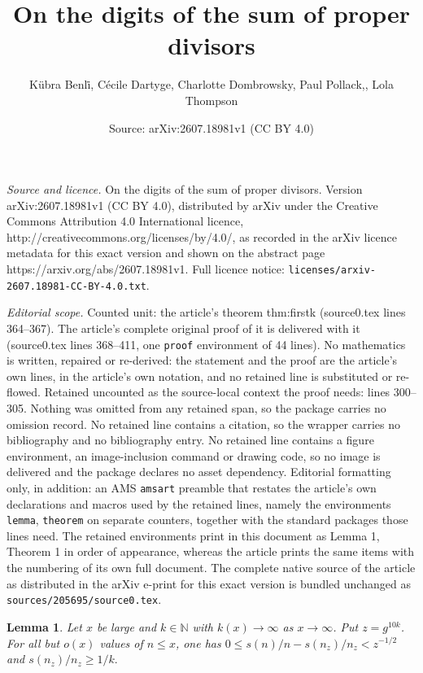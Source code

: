 \documentclass[10pt,a4paper]{amsart}
\title{On the digits of the sum of proper divisors}
\author{K\"ubra Benl\.i, C\'ecile Dartyge, Charlotte Dombrowsky, Paul Pollack,, Lola Thompson}
\date{Source: arXiv:2607.18981v1 (CC BY 4.0)}
\newtheorem{lemma}{Lemma}
\begin{document}
\maketitle

\noindent\emph{Source and licence.} On the digits of the sum of proper divisors. Version arXiv:2607.18981v1 (CC BY 4.0), distributed by arXiv under the Creative Commons Attribution 4.0 International licence, http://creativecommons.org/licenses/by/4.0/, as recorded in the arXiv licence metadata for this exact version and shown on the abstract page https://arxiv.org/abs/2607.18981v1. Full licence notice: \texttt{licenses/arxiv-2607.18981-CC-BY-4.0.txt}.\par\smallskip

\noindent\textit{Editorial scope.} Counted unit: the article's theorem thm:firstk (source0.tex lines 364--367). The article's complete original proof of it is delivered with it (source0.tex lines 368--411, one \texttt{proof} environment of 44 lines). No mathematics is written, repaired or re-derived: the statement and the proof are the article's own lines, in the article's own notation, and no retained line is substituted or re-flowed.  Retained uncounted as the source-local context the proof needs: lines 300--305.  Nothing was omitted from any retained span, so the package carries no omission record.  No retained line contains a citation, so the wrapper carries no bibliography and no bibliography entry.  No retained line contains a figure environment, an image-inclusion command or drawing code, so no image is delivered and the package declares no asset dependency.  Editorial formatting only, in addition: an AMS \texttt{amsart} preamble that restates the article's own declarations and macros used by the retained lines, namely the environments \texttt{lemma}, \texttt{theorem} on separate counters, together with the standard packages those lines need.  The retained environments print in this document as Lemma 1, Theorem 1 in order of appearance, whereas the article prints the same items with the numbering of its own full document.  The complete native source of the article as distributed in the arXiv e-print for this exact version is bundled unchanged as \texttt{sources/205695/source0.tex}.
\begin{lemma}\label{lem: n to nz}
	Let $x$ be large and $k\in \mathbb{N}$ with $k(x)\to\infty$ as $x\to \infty$. Put $z = g^{10k}$.
	For all but $o(x)$ values of $n \leq x$, one has 
	$0 \leq s(n)/n - s(n_z)/n_z < z^{-1/2}$
	and $s(n_z)/n_z \geq 1/k.$
	\end{lemma}
\end{document}
